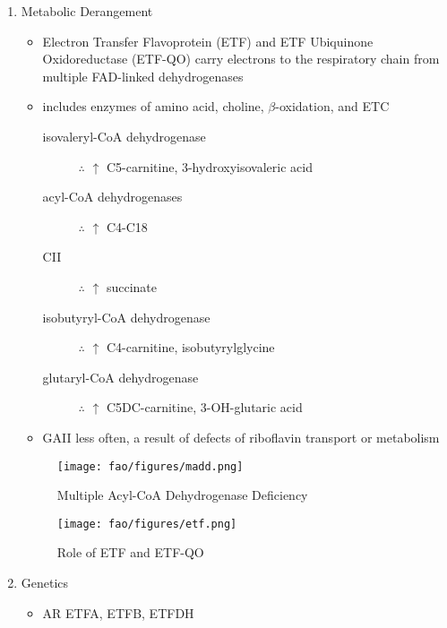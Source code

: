 \documentclass[12pt]{scrartcl}
\begin{document}
\begin{enumerate}
\item Metabolic Derangement
\label{sec:org016764a}
\begin{itemize}
\item Electron Transfer Flavoprotein (ETF) and ETF Ubiquinone
Oxidoreductase (ETF-QO) carry electrons to the respiratory chain from
multiple FAD-linked dehydrogenases
\item includes enzymes of amino acid, choline, \(\beta\)-oxidation, and ETC
\begin{description}
\item[{isovaleryl-CoA dehydrogenase}] \(\therefore\) \(\uparrow\) C5-carnitine, 3-hydroxyisovaleric acid
\item[{acyl-CoA dehydrogenases}] \(\therefore\) \(\uparrow\) C4-C18
\item[{CII}] \(\therefore\) \(\uparrow\) succinate
\item[{isobutyryl-CoA dehydrogenase}] \(\therefore\) \(\uparrow\) C4-carnitine, isobutyrylglycine
\item[{glutaryl-CoA dehydrogenase}] \(\therefore\) \(\uparrow\) C5DC-carnitine, 3-OH-glutaric acid
\end{description}

\item GAII less often, a result of defects of riboflavin transport or
metabolism
\end{itemize}

\begin{figure}[htbp]
\centering
\texttt{[image: fao/figures/madd.png]}
\caption{\label{fig:org6988260}Multiple Acyl-CoA Dehydrogenase Deficiency}
\end{figure}

\begin{figure}[htbp]
\centering
\texttt{[image: fao/figures/etf.png]}
\caption{\label{fig:org86e6183}Role of ETF and ETF-QO}
\end{figure}

\item Genetics
\label{sec:org7962e5d}
\begin{itemize}
\item AR ETFA, ETFB, ETFDH
\end{itemize}


\end{enumerate}
\end{document}

